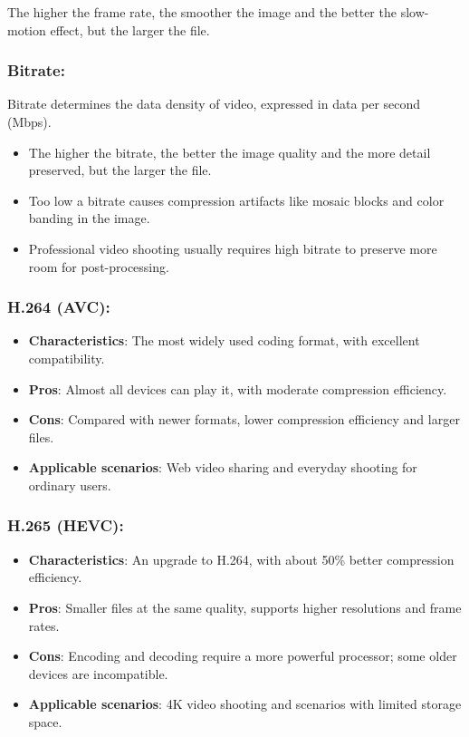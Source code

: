 The higher the frame rate, the smoother the image and the better the slow-motion effect, but the larger the file.

\subsubsection*{Bitrate:}

Bitrate determines the data density of video, expressed in data per second (Mbps).

\begin{itemize}
  \item The higher the bitrate, the better the image quality and the more detail preserved, but the larger the file.
  \item Too low a bitrate causes compression artifacts like mosaic blocks and color banding in the image.
  \item Professional video shooting usually requires high bitrate to preserve more room for post-processing.
\end{itemize}


\subsubsection*{H.264 (AVC):}

\begin{itemize}
  \item \textbf{Characteristics}: The most widely used coding format, with excellent compatibility.
  \item \textbf{Pros}: Almost all devices can play it, with moderate compression efficiency.
  \item \textbf{Cons}: Compared with newer formats, lower compression efficiency and larger files.
  \item \textbf{Applicable scenarios}: Web video sharing and everyday shooting for ordinary users.
\end{itemize}

\subsubsection*{H.265 (HEVC):}

\begin{itemize}
  \item \textbf{Characteristics}: An upgrade to H.264, with about 50\% better compression efficiency.
  \item \textbf{Pros}: Smaller files at the same quality, supports higher resolutions and frame rates.
  \item \textbf{Cons}: Encoding and decoding require a more powerful processor; some older devices are incompatible.
  \item \textbf{Applicable scenarios}: 4K video shooting and scenarios with limited storage space.
\end{itemize}


